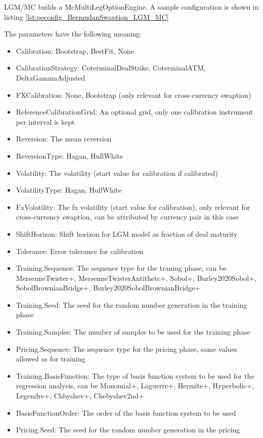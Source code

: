 LGM/MC builds a McMultiLegOptionEngine. A sample configuration is shown in
listing \ref{lst:peconfig_BermudanSwaption_LGM_MC}

The parameters have the following meaning:

\begin{itemize}
\item Calibration: Bootstrap, BestFit, None
\item CalibrationStrategy: CoterminalDealStrike, CoterminalATM, DeltaGammaAdjusted
\item FXCalibration: None, Bootstrap (only relevant for cross-currency swaption)
\item ReferenceCalibrationGrid: An optional grid, only one calibration instrument per interval is kept
\item Reversion: The mean reversion
\item ReversionType: Hagan, HullWhite
\item Volatility: The volatility (start value for calibration if calibrated)
\item VolatilityType: Hagan, HullWhite
\item FxVolatility: The fx volatility (start value for calibration), only relevant for cross-currency swaption, can be
  attributed by currency pair in this case
\item ShiftHorizon: Shift horizon for LGM model as fraction of deal maturity
\item Tolerance: Error tolerance for calibration
\item Training.Sequence: The sequence type for the traning phase, can be MersenneTwister+, MersenneTwisterAntithetc+,
  Sobol+, Burley2020Sobol+, SobolBrownianBridge+, Burley2020SobolBrownianBridge+
\item Training.Seed: The seed for the random number generation in the training phase
\item Training.Samples: The number of samples to be used for the training phase
\item Pricing.Sequence: The sequence type for the pricing phase, same values allowed as for training
\item Training.BasisFunction: The type of basis function system to be used for the regression analysis, can be
  Monomial+, Laguerre+, Hermite+, Hyperbolic+, Legendre+, Chbyshev+, Chebyshev2nd+
\item BasisFunctionOrder: The order of the basis function system to be used
\item Pricing.Seed: The seed for the random number generation in the pricing

\end{itemize}

